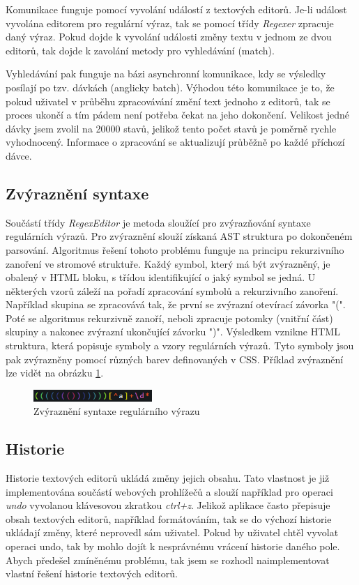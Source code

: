 Komunikace funguje pomocí vyvolání událostí z textových editorů.
Je-li událost vyvolána editorem pro regulární výraz, tak se pomocí třídy \textit{Regexer} zpracuje daný výraz.
Pokud dojde k vyvolání události změny textu v jednom ze dvou editorů, tak dojde k zavolání metody pro vyhledávání (match).

Vyhledávání pak funguje na bázi asynchronní komunikace, kdy se výsledky posílají po tzv. dávkách (anglicky batch).
Výhodou této komunikace je to, že pokud uživatel v průběhu zpracovávání změní text jednoho z editorů, tak se proces ukončí a tím pádem není potřeba čekat na jeho dokončení.
Velikost jedné dávky jsem zvolil na 20000 stavů, jelikož tento počet stavů je poměrně rychle vyhodnocený.
Informace o zpracování se aktualizují průběžně po každé příchozí dávce.

\subsection*{Zvýraznění syntaxe}

Součástí třídy \textit{RegexEditor} je metoda sloužící pro zvýrazňování syntaxe regulárních výrazů. 
Pro zvýraznění slouží získaná AST struktura po dokončeném parsování.
Algoritmus řešení tohoto problému funguje na principu rekurzivního zanoření ve stromové struktuře.
Každý symbol, který má být zvýrazněný, je obalený v HTML bloku, s třídou identifikující o jaký symbol se jedná.
U některých vzorů záleží na pořadí zpracování symbolů a rekurzivního zanoření.
Například skupina se zpracovává tak, že první se zvýrazní otevírací závorka "(".
Poté se algoritmus rekurzivně zanoří, neboli zpracuje potomky (vnitřní část) skupiny a nakonec zvýrazní ukončující závorku ")".
Výsledkem vznikne HTML struktura, která popisuje symboly a vzory regulárních výrazů.
Tyto symboly jsou pak zvýrazněny pomocí různých barev definovaných v CSS. 
Příklad zvýraznění lze vidět na obrázku \ref{fig:RegexHighlight}.

\begin{figure}[!h]
	\centering
	\includegraphics[width=0.4\textwidth]{Figures/highlighting.png}
	\caption{Zvýraznění syntaxe regulárního výrazu}
	\label{fig:RegexHighlight}
\end{figure} 

\subsection*{Historie}
Historie textových editorů ukládá změny jejich obsahu.
Tato vlastnost je již implementována součástí webových prohlížečů a slouží například pro operaci \textit{undo} vyvolanou klávesovou zkratkou \textit{ctrl+z}.
Jelikož aplikace často přepisuje obsah textových editorů, například formátováním, tak se do výchozí historie ukládají změny, které neprovedl sám uživatel.
Pokud by uživatel chtěl vyvolat operaci undo, tak by mohlo dojít k nesprávnému vrácení historie daného pole.
Abych předešel zmíněnému problému, tak jsem se rozhodl naimplementovat vlastní řešení historie textových editorů.

